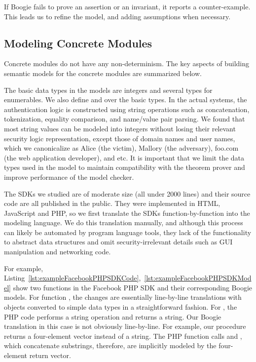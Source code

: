 If Boogie fails to prove an assertion or an invariant, it reports a counter-example. This leads us to refine the model, and adding assumptions when necessary. 

\subsection{Modeling Concrete Modules}

Concrete modules do not have any non-determinism. The key aspects of building semantic models for the concrete modules are summarized below.

  The basic data types in the models are integers and several types for enumerables.  We also define  and  over the basic types.  In the actual systems, the authentication logic is constructed using string operations such as concatenation, tokenization, equality comparison, and name/value pair parsing.  We found that most string values can be modeled into integers without losing their relevant security logic representation, except those of domain names and user names, which we canonicalize as Alice (the victim), Mallory (the adversary), foo.com (the web application developer), and etc.  It is important that we limit the data types used in the model to maintain compatibility with the theorem prover and improve performance of the model checker.

  The SDKs we studied are of moderate size (all under 2000 lines) and their source code are all published in the public.  They were implemented in HTML, JavaScript and PHP, so we first translate the SDKs function-by-function into the modeling language.  We do this translation manually, and although this process can likely be automated by program language tools, they lack of the functionality to abstract data structures and omit security-irrelevant details such as GUI manipulation and networking code.




For example, Listing~\ref{lst:exampleFacebookPHPSDKCode},~\ref{lst:exampleFacebookPHPSDKModel} show two functions in the Facebook PHP SDK and their corresponding Boogie models. For function , the changes are essentially line-by-line translations with objects converted to simple data types in a straightforward fashion.  For , the PHP code performs a string operation and returns a string.  Our Boogie translation in this case is not obviously line-by-line.  For example, our procedure returns a four-element vector instead of a string.  The PHP function calls  and , which concatenate substrings, therefore, are implicitly modeled by the four-element return vector. 

